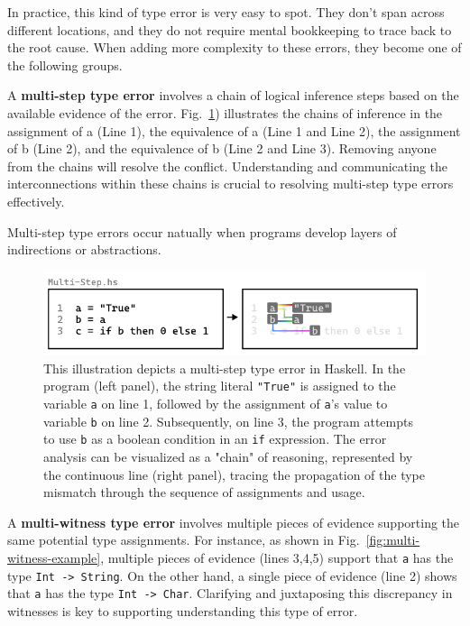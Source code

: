 \documentclass[pdflatex,sn-mathphys-num]{sn-jnl}%
\begin{document}
In practice, this kind of type error is very easy to spot. They don't span across different locations, and they do not require mental bookkeeping to trace back to the root cause. When adding more complexity to these errors, they become one of the following groups.


A \textbf{multi-step type error} involves a chain of logical inference steps based on the available evidence of the error. Fig.~\ref{fig:multi-step-example}) illustrates the chains of inference in the assignment of a (Line 1), the equivalence of a (Line 1 and Line 2), the assignment of b (Line 2), and the equivalence of b (Line 2 and Line 3). Removing anyone from the chains will resolve the conflict. Understanding and communicating the interconnections within these chains is crucial to resolving multi-step type errors effectively.

Multi-step type errors occur natually when programs develop layers of indirections or abstractions.

\begin{figure}[htbp]
  \includegraphics[width=\linewidth]{Multi-Step}
  \caption[This illustration depicts a multi-step type error in Haskell]{
    \label{fig:multi-step-example}
    This illustration depicts a multi-step type error in Haskell. In the program (left panel), the string literal \texttt{"True"} is assigned to the variable \texttt{a} on line 1, followed by the assignment of \texttt{a}'s value to variable \texttt{b} on line 2. Subsequently, on line 3, the program attempts to use \texttt{b} as a boolean condition in an \texttt{if} expression. The error analysis can be visualized as a "chain" of reasoning, represented by the continuous line (right panel), tracing the propagation of the type mismatch through the sequence of assignments and usage. }
\end{figure}

A \textbf{multi-witness type error} involves multiple pieces of evidence supporting the same potential type assignments. For instance, as shown in Fig.~\ref{fig:multi-witness-example}, multiple pieces of evidence (lines 3,4,5) support that \texttt{a} has the type \texttt{Int -> String}. On the other hand, a single piece of evidence (line 2) shows that \texttt{a} has the type \texttt{Int -> Char}.  Clarifying and juxtaposing this discrepancy in witnesses is key to supporting understanding this type of error.
\end{document}
